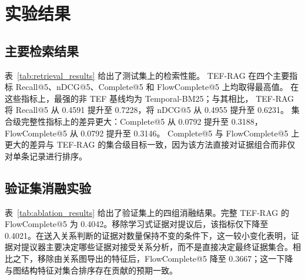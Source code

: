 \section{实验结果}
\label{sec:results}

\subsection{主要检索结果}

表~\ref{tab:retrieval_results} 给出了测试集上的检索性能。
TEF-RAG 在四个主要指标 Recall@5、nDCG@5、Complete@5 和 FlowComplete@5 上均取得最高值。
在这些指标上，最强的非 TEF 基线均为 Temporal-BM25；与其相比，
TEF-RAG 将 Recall@5 从 0.4591 提升至 0.7228，将 nDCG@5 从 0.4955 提升至 0.6231。
集合级完整性指标上的差异更大：Complete@5 从 0.0792 提升至 0.3188，FlowComplete@5 从 0.0792 提升至 0.3146。
Complete@5 与 FlowComplete@5 上更大的差异与 TEF-RAG 的集合级目标一致，因为该方法直接对证据组合而非仅对单条记录进行排序。

\begin{table}[t]
\caption{测试集上的主要检索结果（Top-5）。}
\label{tab:retrieval_results}
\centering
\small
\setlength{\tabcolsep}{3pt}
\end{table}

\subsection{验证集消融实验}
\label{sec:ablation_results}

表~\ref{tab:ablation_results} 给出了验证集上的四组消融结果。完整 TEF-RAG 的 FlowComplete@5 为 0.4042。移除学习式证据对提议后，该指标仅下降至 0.4021。在送入关系判断的证据对数量保持不变的条件下，这一较小变化表明，证据对提议器主要决定哪些证据对接受关系分析，而不是直接决定最终证据集合。相比之下，移除由关系图导出的特征后，FlowComplete@5 降至 0.3667；这一下降与图结构特征对集合排序存在贡献的预期一致。

